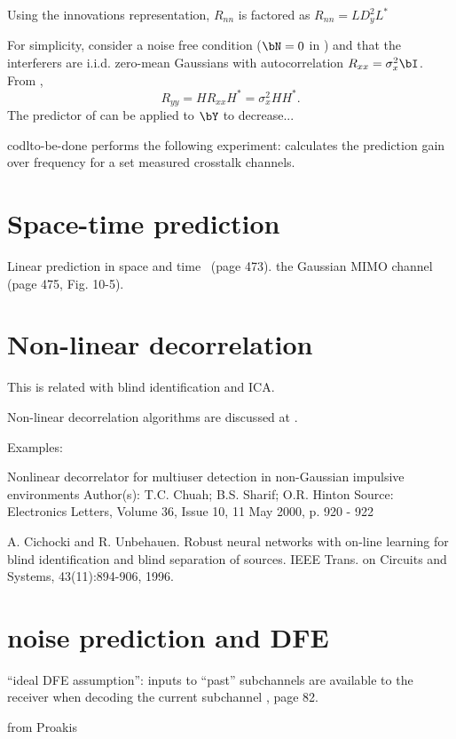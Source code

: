 Using the innovations representation, $R_{nn}$ is factored as $R_{nn} = LD_y^2L^*$

For simplicity, consider a noise free condition ($\bN=0$ in ) and that the interferers are i.i.d. zero-mean Gaussians with autocorrelation $R_{xx} = \sigma_x^2 \bI$. From ,
\[
R_{yy} = H R_{xx} H^* = \sigma_x^2 H H^*.
\]
The predictor of  can be applied to $\bY$ to decrease...

codl{to-be-done} performs the following experiment: 
calculates the prediction gain over frequency for a set measured crosstalk channels.



\section{Space-time prediction}

	Linear prediction in space and time~\cite{Barry04} (page 473).
		the Gaussian MIMO channel~\cite{Barry04} (page 475, Fig. 10-5).
	

\section{Non-linear decorrelation}
	
This is related with blind identification and ICA.	
	
	Non-linear decorrelation algorithms are discussed at
.

Examples:

Nonlinear decorrelator for multiuser detection in non-Gaussian impulsive environments
Author(s): T.C. Chuah; B.S. Sharif; O.R. Hinton
Source: Electronics Letters, Volume 36, Issue 10, 11 May 2000, p. 920 - 922

A. Cichocki and R. Unbehauen. 
Robust neural networks with on-line learning for blind identification and blind separation of sources. 
IEEE Trans. on Circuits and Systems, 43(11):894-906, 1996.
	
\section{noise prediction and DFE}

``ideal DFE assumption'': inputs to ``past'' subchannels are available to the receiver when decoding the current subchannel \cite{Cioffi97}, page 82.
	
	from Proakis

\fi  %

